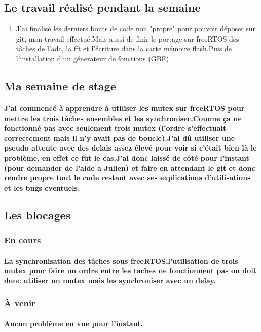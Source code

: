 \documentclass[a4paper]{article}
\begin{document}
 \subsection{Le travail réalisé pendant la semaine}
 \begin{enumerate}
\item {J'ai finalisé les derniers bouts de code non "propre" pour pouvoir déposer sur git, mon travail effectué.Mais aussi de finir le portage sur freeRTOS des tâches de l'adc, la fft et l'écriture dans la carte mémoire flash.Puis de l'installation d'un génerateur de fonctions (GBF).}
\end{enumerate}

\subsection{Ma semaine de stage}
    \paragraph{J'ai commencé à apprendre à utiliser les mutex sur freeRTOS pour mettre les trois tâches ensembles et les synchroniser.Comme ça ne fonctionné pas avec seulement trois mutex (l'ordre s'effectuait correctement mais il n'y avait pas de boucle).J'ai dû utiliser une pseudo attente avec des delais assez élevé pour voir si c'était bien là le problème, en effet ce fût le cas.J'ai donc laissé de côté pour l'instant (pour demander de l'aide a Julien) et faire en attendant le git et donc rendre propre tout le code restant avec ses explications d'utilisations et les bugs eventuels. }
    
    \subsection{Les blocages}
\subsubsection{En cours}
    \paragraph{La synchronisation des tâches sous freeRTOS,l'utilisation de trois mutex pour faire un ordre entre les taches ne fonctionnent pas on doit donc utiliser un mutex mais les synchroniser avec un delay.}
\subsubsection{À venir}
    \paragraph{Aucun problème en vue pour l'instant.}
	\paragraph{}
\end{document}

